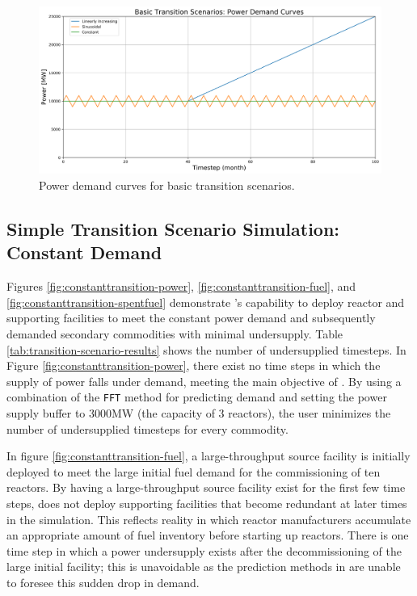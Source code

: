     \begin{figure}[]
        \begin{center}
            \includegraphics[scale=0.5]{./figures/powerplots.png}
        \end{center}
            \caption{Power demand curves for basic transition scenarios.}
        \label{fig:powerplots}
    \end{figure}

\subsection{Simple Transition Scenario Simulation: Constant Demand}
Figures \ref{fig:constanttransition-power}, \ref{fig:constanttransition-fuel},
and \ref{fig:constanttransition-spentfuel} demonstrate \deploy's capability 
to deploy reactor and supporting facilities to meet the
constant power demand and subsequently demanded 
secondary commodities with minimal undersupply. 
Table \ref{tab:transition-scenario-results} shows the number of 
undersupplied timesteps. 
In Figure \ref{fig:constanttransition-power}, there exist no time steps 
in which the supply of power falls under demand, meeting the main 
objective of \deploy. 
By using a combination of the \texttt{FFT} method for 
predicting demand and setting the power supply buffer to 3000MW 
(the capacity of 3 reactors), the user minimizes the number of 
undersupplied timesteps for every commodity.

In figure \ref{fig:constanttransition-fuel},
a large-throughput source facility is initially
deployed to meet the large initial fuel demand for the commissioning 
of ten reactors. 
By having a large-throughput source facility exist for the 
first few time steps, \deploy does not deploy supporting
facilities that become redundant at later times in  
the simulation.
This reflects reality in which reactor manufacturers accumulate
an appropriate amount of fuel inventory before starting 
up reactors. 
There is one time step in which a power undersupply exists after the 
decommissioning of the large initial facility; 
this is unavoidable as the prediction methods in \deploy are 
unable to foresee this sudden drop in demand. 


